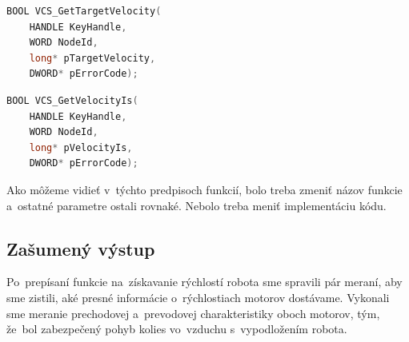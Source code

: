 \label{VelocityIs}
\begin{lstlisting}[language=C++]
BOOL VCS_GetTargetVelocity(
	HANDLE KeyHandle,
	WORD NodeId,
	long* pTargetVelocity,
	DWORD* pErrorCode);
\end{lstlisting}

\begin{lstlisting}[language=C++]
BOOL VCS_GetVelocityIs(
	HANDLE KeyHandle,
	WORD NodeId,
	long* pVelocityIs,
	DWORD* pErrorCode);
\end{lstlisting}

\noindent Ako môžeme vidieť v~týchto predpisoch funkcií, bolo treba zmeniť názov funkcie a~ostatné parametre ostali rovnaké.
Nebolo treba meniť implementáciu kódu.

\subsection{Zašumený výstup}
\label{subsec:outputNoice}

Po~prepísaní funkcie na~získavanie rýchlostí robota sme spravili pár meraní, aby sme zistili,
aké presné informácie o~rýchlostiach motorov dostávame. Vykonali sme meranie prechodovej a~prevodovej charakteristiky
oboch motorov, tým, že~bol zabezpečený pohyb kolies vo~vzduchu s~vypodložením robota.

